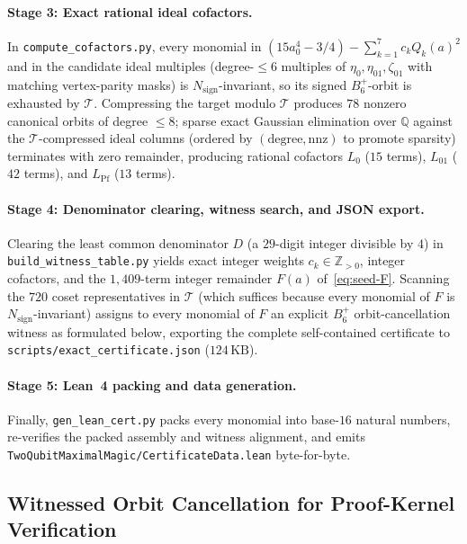\documentclass[11pt,a4paper]{article}
\theoremstyle{plain}
\theoremstyle{definition}
\theoremstyle{remark}
\newcommand{\Z}{\mathbb{Z}}
\newcommand{\Q}{\mathbb{Q}}
\newcommand{\Bplus}{B_6^+}
\newcommand{\code}[1]{\texttt{\small #1}}
\begin{document}
\paragraph{Stage 3: Exact rational ideal cofactors.}
In \code{compute\_cofactors.py}, every monomial in $(15 a_0^4 - 3/4) - \sum_{k=1}^7 c_k Q_k(a)^2$ and in the candidate ideal multiples (degree-$\le 6$ multiples of $\eta_0, \eta_{01}, \zeta_{01}$ with matching vertex-parity masks) is $N_{\mathrm{sign}}$-invariant, so its signed $\Bplus$-orbit is exhausted by $\mathcal{T}$. Compressing the target modulo $\mathcal{T}$ produces $78$ nonzero canonical orbits of degree $\le 8$; sparse exact Gaussian elimination over $\Q$ against the $\mathcal{T}$-compressed ideal columns (ordered by $(\text{degree}, \text{nnz})$ to promote sparsity) terminates with zero remainder, producing rational cofactors $L_0$ ($15$ terms), $L_{01}$ ($42$ terms), and $L_{\mathrm{Pf}}$ ($13$ terms).

\paragraph{Stage 4: Denominator clearing, witness search, and JSON export.}
Clearing the least common denominator $D$ (a $29$-digit integer divisible by $4$) in \code{build\_witness\_table.py} yields exact integer weights $c_k \in \Z_{>0}$, integer cofactors, and the $1{,}409$-term integer remainder $F(a)$ of~\eqref{eq:seed-F}. Scanning the $720$ coset representatives in $\mathcal{T}$ (which suffices because every monomial of $F$ is $N_{\mathrm{sign}}$-invariant) assigns to every monomial of $F$ an explicit $\Bplus$ orbit-cancellation witness as formulated below, exporting the complete self-contained certificate to \code{scripts/exact\_certificate.json} ($124\,\mathrm{KB}$).

\paragraph{Stage 5: Lean~4 packing and data generation.}
Finally, \code{gen\_lean\_cert.py} packs every monomial into base-$16$ natural numbers, re-verifies the packed assembly and witness alignment, and emits \code{TwoQubitMaximalMagic/\allowbreak CertificateData.lean} byte-for-byte.

\subsection{Witnessed Orbit Cancellation for Proof-Kernel Verification}
\end{document}
